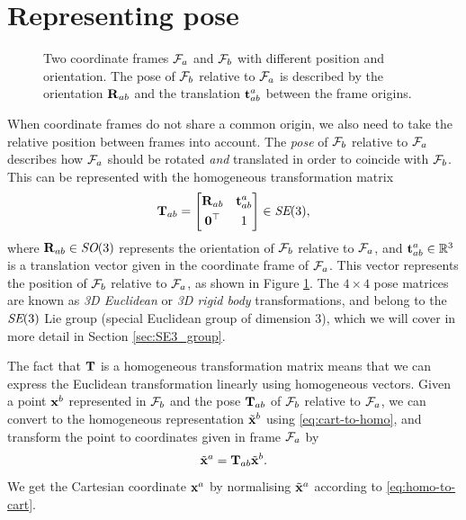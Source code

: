 \section{Representing pose}
\begin{figure}[htb]
    \centering
    
    \caption{Two coordinate frames $\mathcal{F}_a$ and $\mathcal{F}_b$ with different position and orientation. The pose of $\mathcal{F}_b$ relative to $\mathcal{F}_a$ is described by the orientation ${\boldsymbol{\mathbf{R}}}_{ab}$ and the translation ${\boldsymbol{\mathbf{t}}}^a_{ab}$ between the frame origins.}
    \label{fig:pose-illustration}
\end{figure}

When coordinate frames do not share a common origin, we also need to take the relative position between frames into account.
The \emph{pose} of $\mathcal{F}_b$ relative to $\mathcal{F}_a$ describes how $\mathcal{F}_a$ should be rotated \emph{and} translated in order to coincide with $\mathcal{F}_b$.
This can be represented with the homogeneous transformation matrix
\begin{equation}
  {\boldsymbol{\mathbf{T}}}_{ab} = 
  \begin{bmatrix}
  {\boldsymbol{\mathbf{R}}}_{ab} & {\boldsymbol{\mathbf{t}}}^a_{ab}\\[0.3em]
  \boldsymbol{\mathbf{0}}^{\top} & 1
  \end{bmatrix}
  \in \textit{SE}(3),
\end{equation}
where ${\boldsymbol{\mathbf{R}}}_{ab} \in \textit{SO}(3)$ represents the orientation of $\mathcal{F}_b$ relative to $\mathcal{F}_a$, and ${\boldsymbol{\mathbf{t}}}^a_{ab} \in {\mathbb R}^3$ is a translation vector given in the coordinate frame of $\mathcal{F}_a$.
This vector represents the position of $\mathcal{F}_b$ relative to $\mathcal{F}_a$, as shown in Figure \ref{fig:pose-illustration}.
The $4 \times 4$ pose matrices are known as \emph{3D Euclidean} or \emph{3D rigid body} transformations, and belong to the $\textit{SE}(3)$ Lie group (special Euclidean group of dimension 3), which we will cover in more detail in Section \ref{sec:SE3_group}.

The fact that ${\boldsymbol{\mathbf{T}}}$ is a homogeneous transformation matrix means that we can express the Euclidean transformation linearly using homogeneous vectors.
Given a point ${\boldsymbol{\mathbf{x}}}^b$ represented in $\mathcal{F}_b$ and the pose ${\boldsymbol{\mathbf{T}}}_{ab}$ of $\mathcal{F}_b$ relative to $\mathcal{F}_a$, we can convert to the homogeneous representation $\tilde{{\boldsymbol{\mathbf{x}}}}^b$ using \eqref{eq:cart-to-homo}, and transform the point to coordinates given in frame $\mathcal{F}_a$ by
\begin{equation} \label{eq:homo-pose-transf}
  \tilde{{\boldsymbol{\mathbf{x}}}}^a = {\boldsymbol{\mathbf{T}}}_{ab} \tilde{{\boldsymbol{\mathbf{x}}}}^b.
\end{equation}
We get the Cartesian coordinate ${\boldsymbol{\mathbf{x}}}^a$ by normalising $\tilde{{\boldsymbol{\mathbf{x}}}}^a$ according to \eqref{eq:homo-to-cart}.

